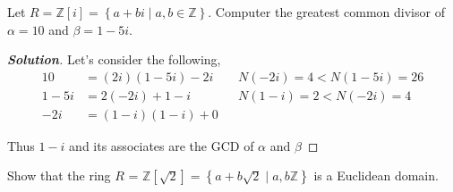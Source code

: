 \documentclass[11pt]{article}
\newenvironment{problem}[2][Problem\!]{\begin{trivlist}
\item[\hskip \labelsep {\bfseries #1}\hskip \labelsep {\bfseries #2}]}{\end{trivlist}}
\newenvironment{solution}{\begin{proof}[\textbf{\textit{Solution}}] }{\end{proof}}
\newcommand{\zz}{\mathbb Z}   %
\newcommand{\set}[1]{\left\{#1\right\}} %
\begin{document}
\begin{tcolorbox}
    \begin{problem} {12.6}
        Let $R =\zz[i] = \set{a + bi \mid a,b\in \zz}$. Computer the greatest common divisor of $\alpha = 10$ and $\beta = 1 - 5i$.
    \end{problem}
\end{tcolorbox}
\begin{solution}
    Let's consider the following,
    \begin{align*}
        10 &= (2i)(1-5i) -2i && N(-2i) = 4 < N(1-5i) = 26\\
        1-5i & = 2(-2i) + 1-i && N(1-i) = 2 < N(-2i) = 4\\
        -2i &= (1-i)(1-i) + 0
    \end{align*}

    Thus $1-i$ and its associates are the GCD of $\alpha$ and $\beta$
\end{solution}

\begin{tcolorbox}
    \begin{problem} {12.9} 
        Show that the ring $R$ = $\zz[\sqrt2] = \set{a +b \sqrt2 \mid a,b \zz}$ is a Euclidean domain. 
    \end{problem}
\end{tcolorbox}
\end{document}
